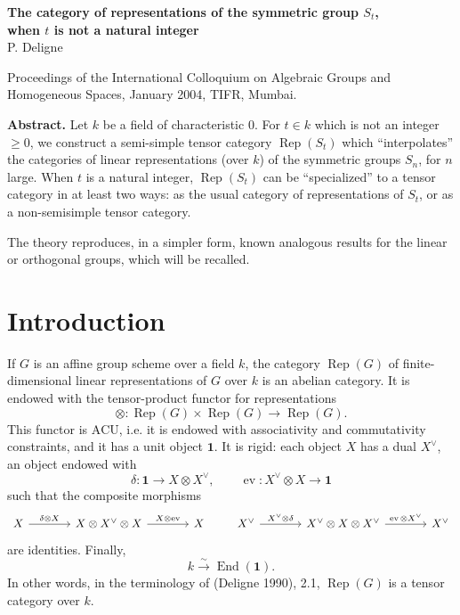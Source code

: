 \documentclass[11pt]{article}
\newcommand{\Rep}{\operatorname{Rep}}
\newcommand{\End}{\operatorname{End}}
\newcommand{\ev}{\operatorname{ev}}
\newcommand{\ACU}{\mathrm{ACU}}
\theoremstyle{deligne}
\begin{document}

\begin{center}
{\Large\bfseries The category of representations of the symmetric group \(S_t\),\\
when \(t\) is not a natural integer}\\[0.5em]
{\large P. Deligne}
\end{center}

\begin{center}
Proceedings of the International Colloquium on Algebraic Groups and Homogeneous Spaces, January 2004, TIFR, Mumbai.
\end{center}

\textbf{Abstract.}
Let \(k\) be a field of characteristic \(0\). For \(t\in k\) which is not an integer \(\geq0\), we construct a semi-simple tensor category \(\Rep(S_t)\) which ``interpolates'' the categories of linear representations (over \(k\)) of the symmetric groups \(S_n\), for \(n\) large. When \(t\) is a natural integer, \(\Rep(S_t)\) can be ``specialized'' to a tensor category in at least two ways: as the usual category of representations of \(S_t\), or as a non-semisimple tensor category.

The theory reproduces, in a simpler form, known analogous results for the linear or orthogonal groups, which will be recalled.

\section*{Introduction}

If \(G\) is an affine group scheme over a field \(k\), the category \(\Rep(G)\) of finite-dimensional linear representations of \(G\) over \(k\) is an abelian category. It is endowed with the tensor-product functor for representations
\[
  \otimes:\Rep(G)\times \Rep(G)\longrightarrow \Rep(G).
\]
This functor is \(\ACU\), i.e. it is endowed with associativity and commutativity constraints, and it has a unit object \(\mathbf 1\). It is rigid: each object \(X\) has a dual \(X^\vee\), an object endowed with
\[
  \delta:\mathbf 1\longrightarrow X\otimes X^\vee,\qquad
  \ev:X^\vee\otimes X\longrightarrow \mathbf 1
\]
such that the composite morphisms
\[
\begin{tikzcd}[column sep=large]
X \arrow[r,"\delta\otimes X"] &
X\otimes X^\vee\otimes X \arrow[r,"X\otimes \ev"] &
X
\end{tikzcd}
\qquad
\begin{tikzcd}[column sep=large]
X^\vee \arrow[r,"X^\vee\otimes\delta"] &
X^\vee\otimes X\otimes X^\vee \arrow[r,"\ev\otimes X^\vee"] &
X^\vee
\end{tikzcd}
\]
are identities. Finally,
\[
  k\overset{\sim}{\longrightarrow}\End(\mathbf 1).
\]
In other words, in the terminology of (Deligne 1990), 2.1, \(\Rep(G)\) is a tensor category over \(k\).
\end{document}
